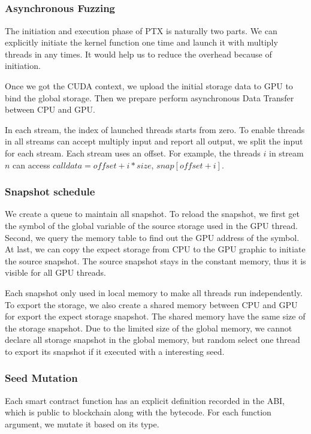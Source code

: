 \subsection{{\runner}}

\subsubsection{Asynchronous Fuzzing}
The initiation and execution phase of PTX is naturally two parts. We can explicitly initiate the kernel function one time and launch it with multiply threads in any times. It would help us to reduce the overhead because of initiation\cite{cudaoverhead}.

Once we got the CUDA context, we upload the initial storage data to GPU to bind the global storage. Then we prepare perform asynchronous Data Transfer between CPU and GPU. 

In each stream, the index of launched threads starts from zero. To enable threads in all streams can accept multiply input and report all output, we split the input for each stream.
Each stream uses an offset.
For example, the threads $i$ in stream $n$ can access $calldata = offset + i * size$, $snap[offset + i]$.



\subsubsection{Snapshot schedule}
We create a queue to maintain all snapshot. To reload the snapshot, we first get the symbol of the global variable of the source storage used in the GPU thread. Second, we query the memory table to find out the GPU address of the symbol. At last, we can copy the expect storage from CPU to the GPU graphic to initiate the source snapshot. The source snapshot stays in the constant memory, thus it is visible for all GPU threads. 

Each snapshot only used in local memory to make all threads run independently. To export the storage, we also create a shared memory between CPU and GPU for export the expect storage snapshot. The shared memory have the same size of the storage snapshot. Due to the limited size of the global memory, we cannot declare all storage snapshot in the global memory, but random select one thread to export its snapshot if it executed with a interesting seed.

\subsubsection{Seed Mutation}
Each smart contract function has an explicit definition recorded in the ABI, which is public to blockchain along with the bytecode.
For each function argument, we mutate it based on its type. 